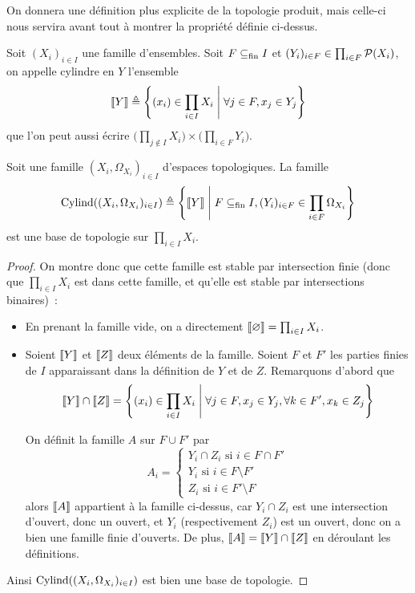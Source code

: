 On donnera une définition plus explicite de la topologie produit, mais celle-ci
nous servira avant tout à montrer la propriété définie ci-dessus.

\begin{definition}[Cylindre]
  Soit $(X_i)_{i\in I}$ une famille d'ensembles. Soit $F\subseteq_{\mathrm{fin}} I$ et
  $(Y_i)_{i\in F} \in \prod_{i \in F} \mathcal{P}(X_i)$, on appelle cylindre en $Y$
  l'ensemble
  \[\llbracket Y\rrbracket \triangleq \Bigg\{(x_i) \in \prod_{i \in I} X_i \;\Bigg|\;
  \forall j \in F, x_j \in Y_j\Bigg\}\]
  que l'on peut aussi écrire
  $\big(\prod_{j\notin I} X_i\big)\times\big(\prod_{i\in F} Y_i\big)$.
\end{definition}

\begin{property}
  Soit une famille $(X_i,\Omega_{X_i})_{i\in I}$ d'espaces topologiques. La
  famille
  \[\operatorname{Cylind}((X_i,\Omega_{X_i})_{i\in I})\triangleq\Bigg\{\llbracket Y\rrbracket \;\Bigg|\;
  F\subseteq_{\mathrm{fin}} I, (Y_i)_{i\in F}\in \prod_{i\in F}\Omega_{X_i}\Bigg\}\]
  est une base de topologie sur $\displaystyle\prod_{i \in I} X_i$.
\end{property}

\begin{proof}
  On montre donc que cette famille est stable par intersection finie (donc que
  $\prod_{i\in I} X_i$ est dans cette famille, et qu'elle est stable par
  intersections binaires)~:
  \begin{itemize}
  \item En prenant la famille vide, on a directement
    $\llbracket \varnothing\rrbracket = \prod_{i\in I} X_i$.
  \item Soient $\llbracket Y\rrbracket$ et $\llbracket Z\rrbracket$ deux éléments de la famille. Soient
    $F$ et $F'$ les parties finies de $I$ apparaissant dans la définition de
    $Y$ et de $Z$. Remarquons d'abord que
    \[\llbracket Y\rrbracket \cap \llbracket Z\rrbracket = \Bigg\{(x_i)\in \prod_{i \in I} X_i \;\Bigg|\;
    \forall j \in F, x_j \in Y_j, \forall k \in F', x_k \in Z_j\Bigg\}\]

    On définit la famille $A$ sur $F\cup F'$ par
    \[A_i =
    \begin{cases}
      Y_i\cap Z_i\text{ si } i\in F\cap F'\\
      Y_i\text{ si } i \in F \setminus F'\\
      Z_i\text{ si } i \in F'\setminus F
    \end{cases}\]
    alors $\llbracket A\rrbracket$ appartient à la famille ci-dessus, car $Y_i\cap Z_i$ est
    une intersection d'ouvert, donc un ouvert, et $Y_i$ (respectivement $Z_i$)
    est un ouvert, donc on a bien une famille finie d'ouverts. De plus,
    $\llbracket A\rrbracket = \llbracket Y\rrbracket \cap \llbracket Z\rrbracket$ en déroulant les définitions.
  \end{itemize}

  Ainsi $\operatorname{Cylind}((X_i,\Omega_{X_i})_{i\in I})$ est bien une base de topologie.
\end{proof}

